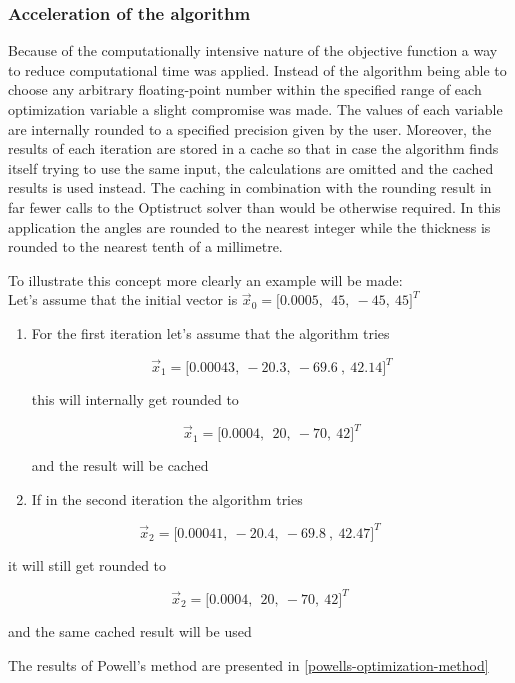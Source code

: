 \subsubsection{Acceleration of the algorithm}
Because of the computationally intensive nature of the objective function a way to reduce computational time was applied. Instead of the algorithm being able to choose any arbitrary floating-point number within the specified range of each optimization variable a slight compromise was made. The values of each variable are internally rounded to a specified precision given by the user. Moreover, the results of each iteration are stored in a cache so that in case the algorithm finds itself trying to use the same input, the calculations are omitted and the cached results is used instead. The caching in combination with the rounding result in far fewer calls to the Optistruct solver than would be otherwise required. In this application the angles are rounded to the nearest integer while the thickness is rounded to the nearest tenth of a
millimetre.

To illustrate this concept more clearly an example will be made:\\

Let's assume that the initial vector is
\({\vec{x}}_{0} = \lbrack 0.0005,\ \ 45,\  - 45,\ 45\rbrack^{T}\)

\begin{enumerate}
\def\labelenumi{\arabic{enumi}.}
\item
  For the first iteration let's assume that the algorithm tries


\[{\vec{x}}_{1} = \lbrack 0.00043,\  - 20.3,\  - 69.6\ ,\ 42.14\rbrack^{T}\]

this will internally get rounded to

\[{\vec{x}}_{1} = \lbrack 0.0004,\ \ 20,\  - 70,\ 42\rbrack^{T}\]

and the result will be cached

\item
  If in the second iteration the algorithm tries
\end{enumerate}

\[{\vec{x}}_{2} = \lbrack 0.00041,\  - 20.4,\  - 69.8\ ,\ 42.47\rbrack^{T}\]

it will still get rounded to

\[{\vec{x}}_{2} = \lbrack 0.0004,\ \ 20,\  - 70,\ 42\rbrack^{T}\]

and the same cached result will be used

The results of Powell's method are presented in \autoref{powells-optimization-method}


